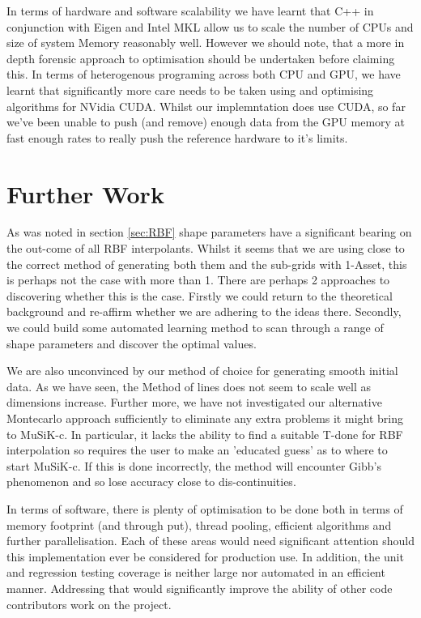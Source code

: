 \documentclass[a4paper]{amsart}
\begin{document}
In terms of hardware and software scalability we have learnt that C++ in conjunction with Eigen and Intel MKL allow us to scale the number of CPUs and size of system Memory reasonably well. However we should note, that a more in depth forensic approach to optimisation should be undertaken before claiming this. In terms of heterogenous programing across both CPU and GPU, we have learnt that significantly more care needs to be taken using and optimising algorithms for NVidia CUDA. Whilst our implemntation does use CUDA, so far we've been unable to push (and remove) enough data from the GPU memory at fast enough rates to really push the reference hardware to it's limits.

\section {Further Work}

As was noted in section \ref{sec:RBF} shape parameters have a significant bearing on the out-come of all RBF interpolants. Whilst it seems that we are using close to the correct method of generating both them and the sub-grids with 1-Asset, this is perhaps not the case with more than 1. There are perhaps 2 approaches to discovering whether this is the case. Firstly we could return to the theoretical background and re-affirm whether we are adhering to the ideas there. Secondly, we could build some automated learning method to scan through a range of shape parameters and discover the optimal values.

We are also unconvinced by our method of choice for generating smooth initial data. As we have seen, the Method of lines does not seem to scale well as dimensions increase. Further more, we have not investigated our alternative Montecarlo approach sufficiently to eliminate any extra problems it might bring to MuSiK-c. In particular, it lacks the ability to find a suitable T-done for RBF interpolation so requires the user to make an 'educated guess' as to where to start MuSiK-c. If this is done incorrectly, the method will encounter Gibb's phenomenon and so lose accuracy close to dis-continuities.

In terms of software, there is plenty of optimisation to be done both in terms of memory footprint (and through put), thread pooling, efficient algorithms and further parallelisation. Each of these areas would need significant attention should this implementation ever be considered for production use. In addition, the unit and regression testing coverage is neither large nor automated in an efficient manner. Addressing that would significantly improve the ability of other code contributors work on the project.
\end{document}
